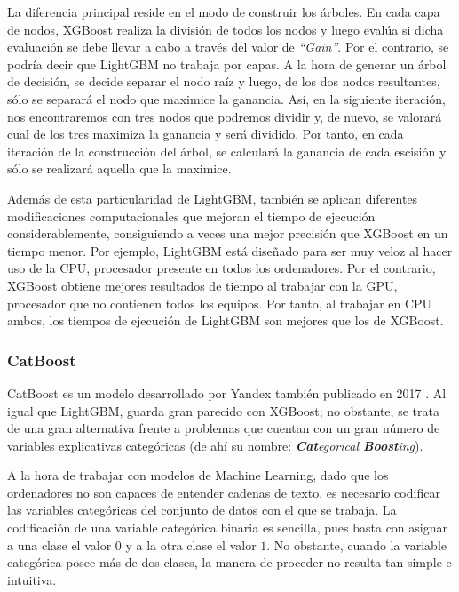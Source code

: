 \documentclass[12pt,twoside]{article}
\begin{document}
La diferencia principal reside en el modo de construir los árboles. En cada capa de nodos, XGBoost realiza la división de todos los nodos y luego evalúa si dicha evaluación se debe llevar a cabo a través del valor de \textit{``Gain''}. Por el contrario, se podría decir que LightGBM no trabaja por capas. A la hora de generar un árbol de decisión, se decide separar el nodo raíz y luego, de los dos nodos resultantes, sólo se separará el nodo que maximice la ganancia. Así, en la siguiente iteración, nos encontraremos con tres nodos que podremos dividir y, de nuevo, se valorará cual de los tres maximiza la ganancia y será dividido. Por tanto, en cada iteración de la construcción del árbol, se calculará la ganancia de cada escisión y sólo se realizará aquella que la maximice.


Además de esta particularidad de LightGBM, también se aplican diferentes modificaciones computacionales que mejoran el tiempo de ejecución considerablemente, consiguiendo a veces una mejor precisión que XGBoost en un tiempo menor. Por ejemplo, LightGBM está diseñado para ser muy veloz al hacer uso de la CPU, procesador presente en todos los ordenadores. Por el contrario, XGBoost obtiene mejores resultados de tiempo al trabajar con la GPU, procesador que no contienen todos los equipos. Por tanto, al trabajar en CPU ambos, los tiempos de ejecución de LightGBM son mejores que los de XGBoost.



\subsubsection{CatBoost} \label{sec:CatBoost}

CatBoost es un modelo desarrollado por Yandex también publicado en 2017 \cite{DO01}. Al igual que LightGBM, guarda gran parecido con XGBoost; no obstante, se trata de una gran alternativa frente a problemas que cuentan con un gran número de variables explicativas categóricas (de ahí su nombre: \textit{\textbf{Cat}egorical \textbf{Boost}ing}).

A la hora de trabajar con modelos de Machine Learning, dado que los ordenadores no son capaces de entender cadenas de texto, es necesario codificar las variables categóricas del conjunto de datos con el que se trabaja. La codificación de una variable categórica binaria es sencilla, pues basta con asignar a una clase el valor $0$ y a la otra clase el valor $1$. No obstante, cuando la variable categórica posee más de dos clases, la manera de proceder no resulta tan simple e intuitiva.
\end{document}
